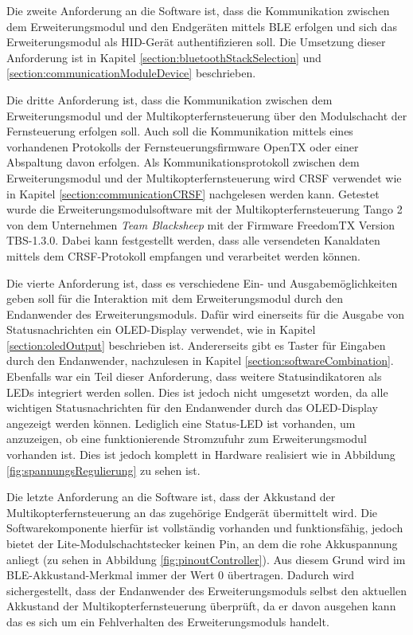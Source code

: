 Die zweite Anforderung an die Software ist, dass die Kommunikation zwischen dem Erweiterungsmodul und den Endgeräten mittels \ac{BLE} erfolgen und sich das Erweiterungsmodul als \ac{HID}-Gerät authentifizieren soll. Die Umsetzung dieser Anforderung ist in Kapitel \ref{section:bluetoothStackSelection} und \ref{section:communicationModuleDevice} beschrieben.

Die dritte Anforderung ist, dass die Kommunikation zwischen dem Erweiterungsmodul und der Multikopterfernsteuerung über den Modulschacht der Fernsteuerung erfolgen soll. Auch soll die Kommunikation mittels eines vorhandenen Protokolls der Fernsteuerungsfirmware OpenTX oder einer Abspaltung davon erfolgen. Als Kommunikationsprotokoll zwischen dem Erweiterungsmodul und der Multikopterfernsteuerung wird CRSF verwendet wie in Kapitel \ref{section:communicationCRSF} nachgelesen werden kann. Getestet wurde die Erweiterungsmodulsoftware mit der Multikopterfernsteuerung Tango 2 von dem Unternehmen \textit{Team Blacksheep} mit der Firmware FreedomTX Version TBS-1.3.0. Dabei kann festgestellt werden, dass alle versendeten Kanaldaten mittels dem CRSF-Protokoll empfangen und verarbeitet werden können.

Die vierte Anforderung ist, dass es verschiedene Ein- und Ausgabemöglichkeiten geben soll für die Interaktion mit dem Erweiterungsmodul durch den Endanwender des Erweiterungsmoduls. Dafür wird einerseits für die Ausgabe von Statusnachrichten ein \acs{OLED}-Display verwendet, wie in Kapitel \ref{section:oledOutput} beschrieben ist. Andererseits gibt es Taster für Eingaben durch den Endanwender, nachzulesen in Kapitel \ref{section:softwareCombination}. Ebenfalls war ein Teil dieser Anforderung, dass weitere Statusindikatoren als \acp{LED} integriert werden sollen. Dies ist jedoch nicht umgesetzt worden, da alle wichtigen Statusnachrichten für den Endanwender durch das \acs{OLED}-Display angezeigt werden können. Lediglich eine Status-\ac{LED} ist vorhanden, um anzuzeigen, ob eine funktionierende Stromzufuhr zum Erweiterungsmodul vorhanden ist. Dies ist jedoch komplett in Hardware realisiert wie in Abbildung \ref{fig:spannungsRegulierung} zu sehen ist.


Die letzte Anforderung an die Software ist, dass der Akkustand der Multikopterfernsteuerung an das zugehörige Endgerät übermittelt wird. Die Softwarekomponente hierfür ist vollständig vorhanden und funktionsfähig, jedoch bietet der Lite-Modulschachtstecker keinen Pin, an dem die rohe Akkuspannung anliegt (zu sehen in Abbildung \ref{fig:pinoutController}). Aus diesem Grund wird im \ac{BLE}-Akkustand-Merkmal immer der Wert 0 übertragen. Dadurch wird sichergestellt, dass der Endanwender des Erweiterungsmoduls selbst den aktuellen Akkustand der Multikopterfernsteuerung überprüft, da er davon ausgehen kann das es sich um ein Fehlverhalten des Erweiterungsmoduls handelt.

